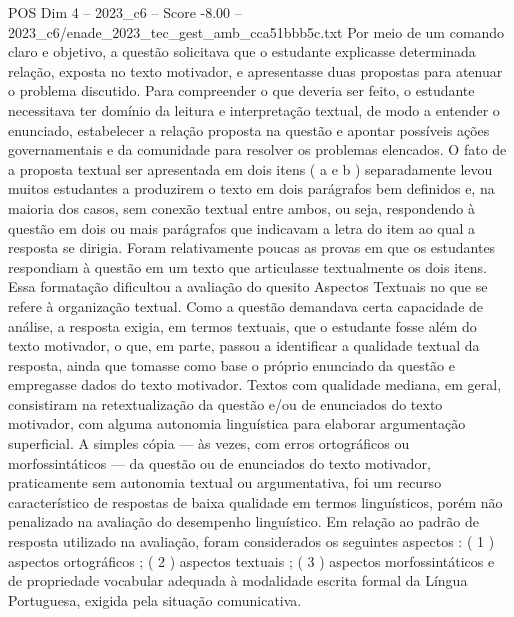 \begin{textsample}{POS Dim 4 – 2023\_c6 – Score -8.00 – 2023\_c6/enade\_2023\_tec\_gest\_amb\_cca51bbb5c.txt}
Por meio de um comando claro e objetivo, a questão solicitava que o estudante explicasse determinada relação, exposta no texto motivador, e apresentasse duas propostas para atenuar o problema discutido.
Para compreender o que deveria ser feito, o estudante necessitava ter domínio da leitura e interpretação textual, de modo a entender o enunciado, estabelecer a relação proposta na questão e apontar possíveis ações governamentais e da comunidade para resolver os problemas elencados.
O fato de a proposta textual ser apresentada em dois itens ( a e b ) separadamente levou muitos estudantes a produzirem o texto em dois parágrafos bem definidos e, na maioria dos casos, sem conexão textual entre ambos, ou seja, respondendo à questão em dois ou mais parágrafos que indicavam a letra do item ao qual a resposta se dirigia.
Foram relativamente poucas as provas em que os estudantes respondiam à questão em um texto que articulasse textualmente os dois itens.
Essa formatação dificultou a avaliação do quesito Aspectos Textuais no que se refere à organização textual.
Como a questão demandava certa capacidade de análise, a resposta exigia, em termos textuais, que o estudante fosse além do texto motivador, o que, em parte, passou a identificar a qualidade textual da resposta, ainda que tomasse como base o próprio enunciado da questão e empregasse dados do texto motivador.
Textos com qualidade mediana, em geral, consistiram na retextualização da questão e/ou de enunciados do texto motivador, com alguma autonomia linguística para elaborar argumentação superficial.
A simples cópia — às vezes, com erros ortográficos ou morfossintáticos — da questão ou de enunciados do texto motivador, praticamente sem autonomia textual ou argumentativa, foi um recurso característico de respostas de baixa qualidade em termos linguísticos, porém não penalizado na avaliação do desempenho linguístico.
Em relação ao padrão de resposta utilizado na avaliação, foram considerados os seguintes aspectos : ( 1 ) aspectos ortográficos ; ( 2 ) aspectos textuais ; ( 3 ) aspectos morfossintáticos e de propriedade vocabular adequada à modalidade escrita formal da Língua Portuguesa, exigida pela situação comunicativa.

\end{textsample}
